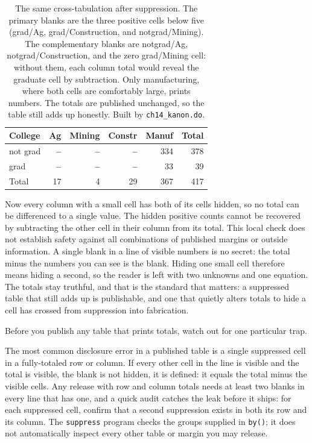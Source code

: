 \documentclass[
    a4paper,
    fontsize=10pt,
    twoside=true,
    numbers=noenddot,
]{kaobook}
\newenvironment{vizcallout}[1][Visualization to build]{%
    \begin{vizbox}[frametitle={#1}]%
}{%
    \end{vizbox}%
}
\begin{document}
\begin{table}[htbp]
\centering
{\footnotesize
\begin{tabular}{lrrrrr}
\hline
College   & Ag & Mining & Constr & Manuf & Total \\
\hline
not grad  & \textbf{--} & \textbf{--} & \textbf{--} & 334 & 378 \\
grad      & \textbf{--} & \textbf{--} & \textbf{--} &  33 &  39 \\
\hline
Total     & 17 &  4 & 29 & 367 & 417 \\
\hline
\end{tabular}
}
\caption[Primary and complementary suppression]{The same cross-tabulation after suppression. The primary blanks are the three positive cells below five (grad/Ag, grad/Construction, and notgrad/Mining). The complementary blanks are notgrad/Ag, notgrad/Construction, and the zero grad/Mining cell: without them, each column total would reveal the graduate cell by subtraction. Only manufacturing, where both cells are comfortably large, prints numbers. The totals are published unchanged, so the table still adds up honestly. Built by \texttt{ch14\_kanon.do}.}
\label{tab:suppress}
\end{table}

Now every column with a small cell has both of its cells hidden, so no total can be differenced to a single value. The hidden positive counts cannot be recovered by subtracting the other cell in their column from its total. This local check does not establish safety against all combinations of published margins or outside information. A single blank in a line of visible numbers is no secret: the total minus the numbers you can see is the blank. Hiding one small cell therefore means hiding a second, so the reader is left with two unknowns and one equation. The totals stay truthful, and that is the standard that matters: a suppressed table that still adds up is publishable, and one that quietly alters totals to hide a cell has crossed from suppression into fabrication.

Before you publish any table that prints totals, watch out for one particular trap.

\begin{vizcallout}[Suppression that leaks: the single-blank trap]
The most common disclosure error in a published table is a single suppressed cell in a fully-totaled row or column. If every other cell in the line is visible and the total is visible, the blank is not hidden, it is defined: it equals the total minus the visible cells. Any release with row and column totals needs at least two blanks in every line that has one, and a quick audit catches the leak before it ships: for each suppressed cell, confirm that a second suppression exists in both its row and its column. The \texttt{suppress} program checks the groups supplied in \texttt{by()}; it does not automatically inspect every other table or margin you may release.
\end{vizcallout}
\end{document}
